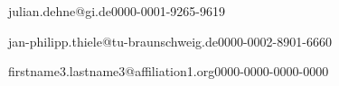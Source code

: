\author[1]{Julian Dehne}{julian.dehne@gi.de}{0000-0001-9265-9619}
\author[2]{Jan Philipp Thiele}{jan-philipp.thiele@tu-braunschweig.de}{0000-0002-8901-6660}
\author[3]{Firstname3 Lastname3}{firstname3.lastname3@affiliation1.org}{0000-0000-0000-0000}
